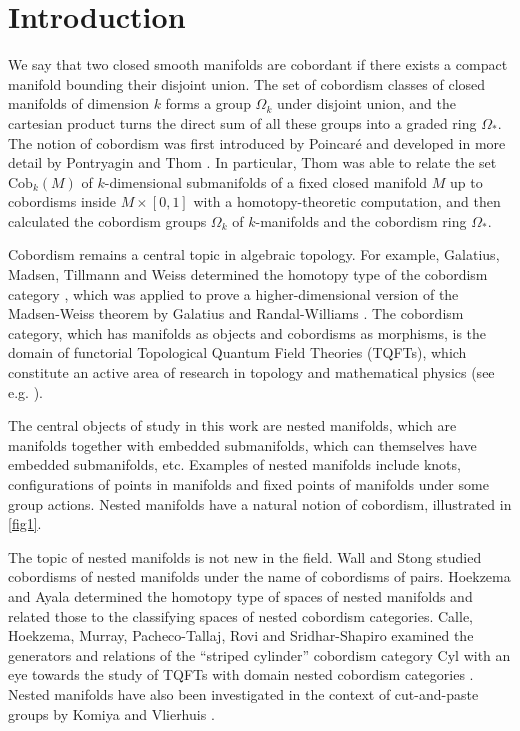 \documentclass[a4paper, 11pt,reqno]{amsart}
\theoremstyle{plain}
\theoremstyle{definition}
\begin{document}
\section{Introduction}
We say that two closed smooth manifolds are cobordant if there exists a compact manifold bounding their disjoint union. The set of cobordism classes of closed manifolds of dimension $k$ forms a group $\Omega_k$ under disjoint union, and the cartesian product turns the direct sum of all these groups into a graded ring $\Omega_\ast$. The notion of cobordism was first introduced by Poincar\'{e} and developed in more detail by Pontryagin \cite{pontrjagin2007smooth} and Thom \cite{Thom}. In particular, Thom was able to relate the set $\mathrm{Cob}_k(M)$ of $k$-dimensional submanifolds of a fixed closed manifold $M$ up to cobordisms inside $M\times[0,1]$ with a homotopy-theoretic computation, and then calculated the cobordism groups $\Omega_k$ of $k$-manifolds and the cobordism ring $\Omega_\ast$.\par
Cobordism remains a central topic in algebraic topology. For example, Galatius, Madsen, Tillmann and Weiss determined the homotopy type of the cobordism category \cite{galatius2009homotopy}, which was applied to prove a higher-dimensional version of the Madsen-Weiss theorem by Galatius and Randal-Williams \cite{stablemoduli}. The cobordism category, which has manifolds as objects and cobordisms as morphisms, is the domain of functorial Topological Quantum Field Theories (TQFTs), which constitute an active area of research in topology and mathematical physics (see e.g. \cite{freedhopkins}).\par
The central objects of study in this work are nested manifolds, which are manifolds together with embedded submanifolds, which can themselves have embedded submanifolds, etc. Examples of nested manifolds include knots, configurations of points in manifolds and fixed points of manifolds under some group actions. Nested manifolds have a natural notion of cobordism, illustrated in \cref{fig1}.\par
The topic of nested manifolds is not new in the field. Wall \cite{Wallbook,Wallpairs} and Stong \cite{strong1971cobordism} studied cobordisms of nested manifolds under the name of cobordisms of pairs. Hoekzema \cite{Renee} and Ayala \cite[Section 11.5]{ayala} determined the homotopy type of spaces of nested manifolds and related those to the classifying spaces of nested cobordism categories. Calle, Hoekzema, Murray, Pacheco-Tallaj, Rovi and Sridhar-Shapiro examined the generators and relations of the ``striped cylinder'' cobordism category $\mathrm{Cyl}$ with an eye towards the study of TQFTs with domain nested cobordism categories \cite{cyl}. Nested manifolds have also been investigated in the context of cut-and-paste groups by Komiya \cite{komiya} and Vlierhuis \cite{Rolf}.\par
\end{document}

